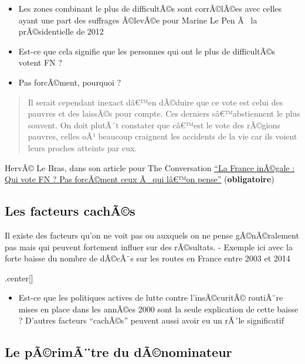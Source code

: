 \documentclass[]{article}
\newcommand{\euro}{€}
\providecommand{\tightlist}{%
  \setlength{\itemsep}{0pt}\setlength{\parskip}{0pt}}
\begin{document}
\begin{itemize}
\item
  Les zones combinant le plus de difficultÃ©s sont corrÃ©lÃ©es avec
  celles ayant une part des suffrages Ã©levÃ©e pour Marine Le Pen Ã~ la
  prÃ©sidentielle de 2012
\item
  Est-ce que cela signifie que les personnes qui ont le plus de
  difficultÃ©s votent FN ?
\item
  Pas forcÃ©ment, pourquoi ?
\end{itemize}

\begin{quote}
Il serait cependant inexact dâ\euro{}™en dÃ©duire que ce vote est celui
des pauvres et des laissÃ©s pour compte. Ces derniers
sâ\euro{}™abstiennent le plus souvent. On doit plutÃ´t constater que
câ\euro{}™est le vote des rÃ©gions pauvres, celles oÃ¹ beaucoup
craignent les accidents de la vie car ils voient leurs proches atteints
par eux.
\end{quote}

HervÃ© Le Bras, dans son article pour The Conversation
\href{https://theconversation.com/la-france-inegale-qui-vote-fn-pas-forcement-ceux-a-qui-lon-pense-75977}{``La
France inÃ©gale : Qui vote FN ? Pas forcÃ©ment ceux Ã~ qui lâ\euro{}™on
pense''} (\textbf{obligatoire})

\subsection{Les facteurs cachÃ©s}\label{les-facteurs-cachas}

Il existe des facteurs qu'on ne voit pas ou auxquels on ne pense
gÃ©nÃ©ralement pas mais qui peuvent fortement influer sur des
rÃ©sultats. - Exemple ici avec la forte baisse du nombre de dÃ©cÃ¨s sur
les routes en France entre 2003 et 2014

.center{[}{]}

\begin{itemize}
\tightlist
\item
  Est-ce que les politiques actives de lutte contre l'insÃ©curitÃ©
  routiÃ¨re mises en place dans les annÃ©es 2000 sont la seule
  explication de cette baisse ? D'autres facteurs ``cachÃ©s'' peuvent
  aussi avoir eu un rÃ´le significatif
\end{itemize}

\subsection{Le pÃ©rimÃ¨tre du
dÃ©nominateur}\label{le-parimatre-du-danominateur}
\end{document}

